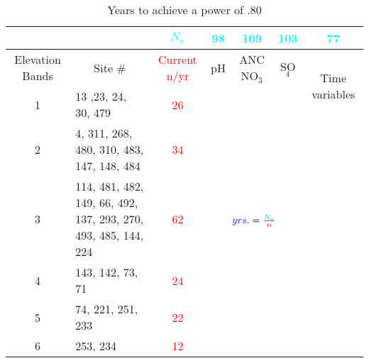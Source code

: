\begin{table}\scriptsize
\caption{Years to achieve a power of .80}
\begin{tabular}{clccccc}
&&\textcolor{cyan}{$N_a$}&\textcolor{cyan}{98}&\textcolor{cyan}{109}&\textcolor{cyan}{103}&\textcolor{cyan}{77}\\
\toprule
\multicolumn{1}{p{.5cm}}{Elevation Bands} & \multicolumn{1}{c}{Site \#} & \multicolumn{1}{p{.5cm}}{\textcolor{red}{Current n/yr}} & \multicolumn{1}{p{.5cm}}{pH} &\multicolumn{1}{p{.5cm}}{ ANC NO$_3$} & SO$_4$ & \multirow{2}{.8cm}{Time variables} \\  
\midrule
1 & 13 ,23, 24, 30, 479 & \textcolor{red}{26} &\multicolumn{4}{c}{\multirow{6}{*}{\huge$\textcolor{blue}{yrs.} = {\textcolor{cyan}{N_a} \over \textcolor{red}{n}}$}}  \\ 
2 & \multicolumn{1}{p{4cm}}{4, 311, 268, 480, 310, 483, 147, 148, 484} &\textcolor{red}{34} &\multicolumn{4}{c}{} \\ 
3 & \multicolumn{ 1}{p{4cm}}{114, 481, 482, 149, 66, 492, 137, 293, 270, 493, 485, 144, 224} & \textcolor{red}{62}&\multicolumn{4}{c}{}   \\ 
4 & 143, 142, 73, 71 &\textcolor{red}{24} &\multicolumn{4}{c}{}  \\ 
5 & 74, 221, 251, 233 & \textcolor{red}{22} &\multicolumn{4}{c}{}   \\ 
6 & 253, 234 & \textcolor{red}{12} &\multicolumn{4}{c}{}  \\  
\bottomrule
\end{tabular}
\end{table}